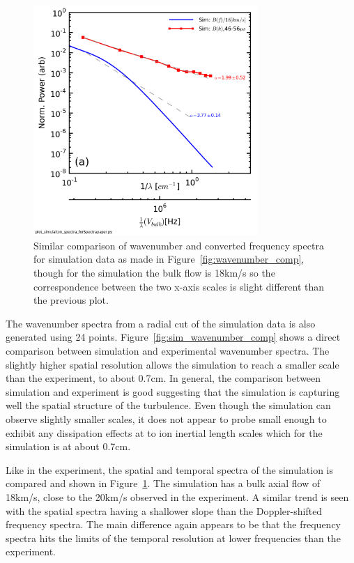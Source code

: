 \documentclass[aip,prl,amsmath,amssymb,reprint,superscriptaddress]{revtex4-1} %
\begin{document}
\begin{figure}[!htbp]
\centerline{
\includegraphics[width=8.5cm]{Simulation_spatial_temporal_spectra_comparision}}
\caption{\label{fig:sim_spatial_comp} Similar comparison of wavenumber and converted frequency spectra for simulation data as made in Figure~\ref{fig:wavenumber_comp}, though for the simulation the bulk flow is 18km/s so the correspondence between the two x-axis scales is slight different than the previous plot.}
\end{figure}

The wavenumber spectra from a radial cut of the simulation data is also generated using 24 points. Figure~\ref{fig:sim_wavenumber_comp} shows a direct comparison between simulation and experimental wavenumber spectra. The slightly higher spatial resolution allows the simulation to reach a smaller scale than the experiment, to about 0.7cm. In general, the comparison between simulation and experiment is good suggesting that the simulation is capturing well the spatial structure of the turbulence. Even though the simulation can observe slightly smaller scales, it does not appear to probe small enough to exhibit any dissipation effects at to ion inertial length scales which for the simulation is at about 0.7cm.

Like in the experiment, the spatial and temporal spectra of the simulation is compared and shown in Figure~\ref{fig:sim_spatial_comp}. The simulation has a bulk axial flow of 18km/s, close to the 20km/s observed in the experiment. A similar trend is seen with the spatial spectra having a shallower slope than the Doppler-shifted frequency spectra. The main difference again appears to be that the frequency spectra hits the limits of the temporal resolution at lower frequencies than the experiment.
\end{document}
